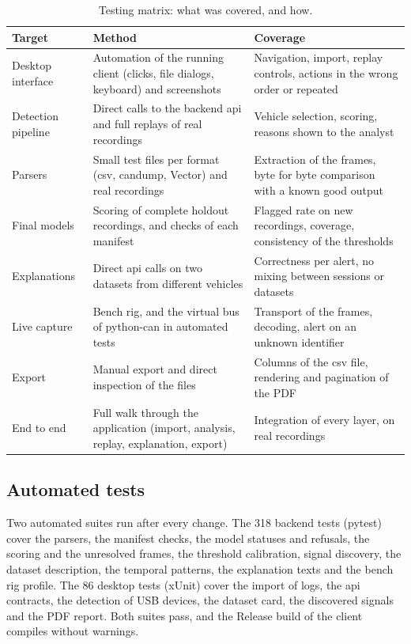\begin{table}[H]
\centering
\small
\caption{Testing matrix: what was covered, and how.}
\label{tab:testing-matrix}
\begin{tabularx}{\textwidth}{|l|Y|Y|}
\hline
\textbf{Target} & \textbf{Method} & \textbf{Coverage} \\
\hline
Desktop interface & Automation of the running client (clicks, file dialogs, keyboard) and screenshots & Navigation, import, replay controls, actions in the wrong order or repeated \\
\hline
Detection pipeline & Direct calls to the backend \gls{api} and full replays of real recordings & Vehicle selection, scoring, reasons shown to the analyst \\
\hline
Parsers & Small test files per format (\gls{csv}, candump, Vector) and real recordings & Extraction of the frames, byte for byte comparison with a known good output \\
\hline
Final models & Scoring of complete holdout recordings, and checks of each manifest & Flagged rate on new recordings, coverage, consistency of the thresholds \\
\hline
Explanations & Direct \gls{api} calls on two datasets from different vehicles & Correctness per alert, no mixing between sessions or datasets \\
\hline
Live capture & Bench rig, and the virtual bus of python-can in automated tests & Transport of the frames, decoding, alert on an unknown identifier \\
\hline
Export & Manual export and direct inspection of the files & Columns of the \gls{csv} file, rendering and pagination of the PDF \\
\hline
End to end & Full walk through the application (import, analysis, replay, explanation, export) & Integration of every layer, on real recordings \\
\hline
\end{tabularx}
\end{table}

\subsection{Automated tests}

Two automated suites run after every change. The 318 backend tests (pytest) cover the parsers, the manifest checks, the model statuses and refusals, the scoring and the unresolved frames, the threshold calibration, signal discovery, the dataset description, the temporal patterns, the explanation texts and the bench rig profile. The 86 desktop tests (xUnit) cover the import of logs, the \gls{api} contracts, the detection of USB devices, the dataset card, the discovered signals and the PDF report. Both suites pass, and the Release build of the client compiles without warnings.

